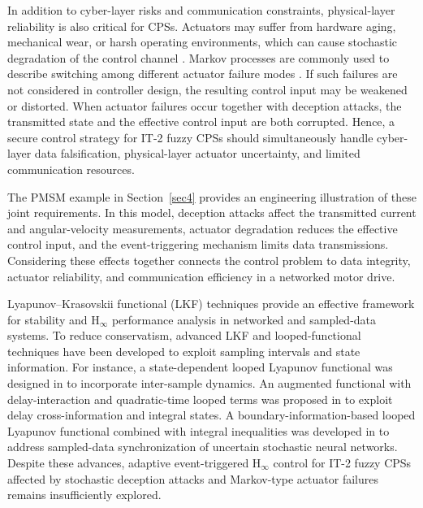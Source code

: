 \documentclass[preprint,review,fleqn,sort&compress,3p]{elsarticle}
\theoremstyle{definition} %
\theoremstyle{definition}%
\begin{document}
In addition to cyber-layer risks and communication constraints, physical-layer
reliability is also critical for CPSs. Actuators may suffer from hardware aging,
mechanical wear, or harsh operating environments, which can cause stochastic
degradation of the control channel
\cite{chenProbabilisticEventTriggeredPolicy2023,caiAdaptiveFaulttolerantControl2025}.
Markov processes are commonly used to describe switching among different actuator
failure modes \cite{yaoMultiSensorBasedSwitchingEventTriggered2024,xuAsynchronousEventTriggeredControl2024}.
If such failures are not considered in controller design, the resulting control
input may be weakened or distorted. When actuator failures occur together with
deception attacks, the
transmitted state and the effective control input are both corrupted. Hence, a
secure control strategy for IT-2 fuzzy CPSs should simultaneously handle
cyber-layer data falsification, physical-layer actuator uncertainty, and limited
communication resources.

The PMSM example in Section~\ref{sec4} provides an engineering illustration of these joint requirements. In this model, deception attacks affect the transmitted current and angular-velocity measurements, actuator degradation reduces the effective control input, and the event-triggering mechanism limits data transmissions. Considering these effects together connects the control problem to data integrity, actuator reliability, and communication efficiency in a networked motor drive.

Lyapunov--Krasovskii functional (LKF) techniques provide an effective framework for stability and $\mathrm{H}_\infty$ performance analysis in networked and sampled-data systems. To reduce conservatism, advanced LKF and looped-functional techniques
have been developed to exploit sampling intervals and state information. For
instance, a state-dependent looped Lyapunov functional was designed in
\cite{lianNewResultsStability2020} to incorporate inter-sample dynamics. An
augmented functional with delay-interaction and quadratic-time looped terms was
proposed in \cite{zhangMixedDelayBasedAugmentedFunctional2024} to exploit delay
cross-information and integral states. A boundary-information-based looped
Lyapunov functional combined with integral inequalities was developed in
\cite{ganesanSynchronizationStochasticNeural2024} to address sampled-data synchronization of uncertain stochastic neural networks. Despite these advances, adaptive event-triggered $\mathrm{H}_\infty$ control for IT-2 fuzzy CPSs affected by stochastic deception attacks and Markov-type actuator failures remains insufficiently explored.
\end{document}
